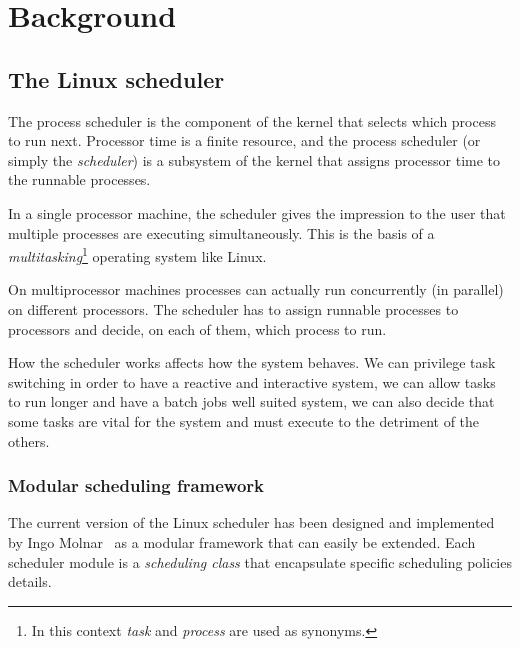 \chapter{Background\label{chap:background}}

\section{The Linux scheduler\label{sec:LinuxSched}}

The process scheduler is the component of the kernel that selects
which process to run next. Processor time is a finite resource, and the
process scheduler (or simply the \emph{scheduler}) is a subsystem of
the kernel that assigns processor time to the runnable processes.

In a single processor machine, the scheduler gives the impression
to the user that multiple processes are executing simultaneously.
This is the basis of a \emph{multitasking}\footnote{In this context \emph{task}
and \emph{process} are used as synonyms.} operating system like Linux.

On multiprocessor machines processes can actually run concurrently (in
parallel) on different processors. The scheduler has to assign runnable
processes to processors and decide, on each of them, which process to run. 

How the scheduler works affects how the system behaves. We can privilege task
switching in order to have a reactive and interactive system, we can allow
tasks to run longer and have a batch jobs well suited system, we can also
decide that some tasks are vital for the system and must execute to the
detriment of the others.

\subsection{Modular scheduling framework\label{sec:LinuxSched_structure}}

The current version of the Linux scheduler has been designed and implemented by Ingo
Molnar~\cite{molnar07} as a modular framework that can easily be extended.
Each scheduler module is a \emph{scheduling class} that encapsulate specific
scheduling policies details.

